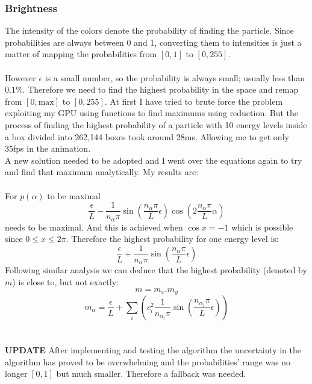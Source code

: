 \documentclass[a4paper, 10pt]{article}
\begin{document}
        \subsubsection{Brightness} \label{sec:brightness}
        \label{sec:brightness}
        The intensity of the colors denote the probability of finding the particle. Since
        probabilities are always between 0 and 1, converting them to intensities is just
        a matter of mapping the probabilities from $[0, 1]$ to $[0, 255]$.\\\\
        However $\epsilon$ is a small number, so the probability is always small; usually
        less than $0.1\%$. Therefore we need to find the highest probability in the space
        and remap from $[0, \text{max}]$ to $[0, 255]$. At first I have tried to brute force
        the problem exploiting my GPU using functions to find maximums using reduction. But
        the process of finding the highest probability of a particle with 10 energy levels
        inside a box divided into 262,144 boxes took around 28ms. Allowing me to get only
        35fps in the animation.\\
        A new solution needed to be adopted and I went over the equations again to try and
        find that maximum analytically. My results are:\\\\
        For $p(\alpha)$ to be maximal
        $$\frac{\epsilon}{L} - \frac{1}{n_{\alpha}\pi} \sin\left(\frac{n_{\alpha}\pi}{L}\epsilon\right)
        \cos\left(2\frac{n_{\alpha}\pi}{L}\alpha\right)$$
        needs to be maximal.  And this is achieved when $\cos{x} = -1$ which is possible
        since $0 \leq x \leq 2\pi$. Therefore the highest probability for one energy
        level is: 
        $$\frac{\epsilon}{L} + \frac{1}{n_{\alpha}\pi} \sin(\frac{n_{\alpha}\pi}{L}\epsilon)$$
        Following similar analysis we can deduce that the highest probability (denoted by
        $m$) is close to,
        but not exactly:
        $$m = m_x . m_y$$
        $$m_{\alpha} = \frac{\epsilon}{L} + \sum_i \left ( c^2_i \frac{1}{n_{\alpha_i}\pi}
        \sin\left(\frac{n_{\alpha_i}\pi}{L}\epsilon\right) \right )$$\\\\
        \textbf{UPDATE} After implementing and testing the algorithm the uncertainty in the algorithm
        has proved to be overwhelming and the probabilities' range was no longer $[0, 1]$ but much smaller.
        Therefore a fallback was needed.\\\\
\end{document}
